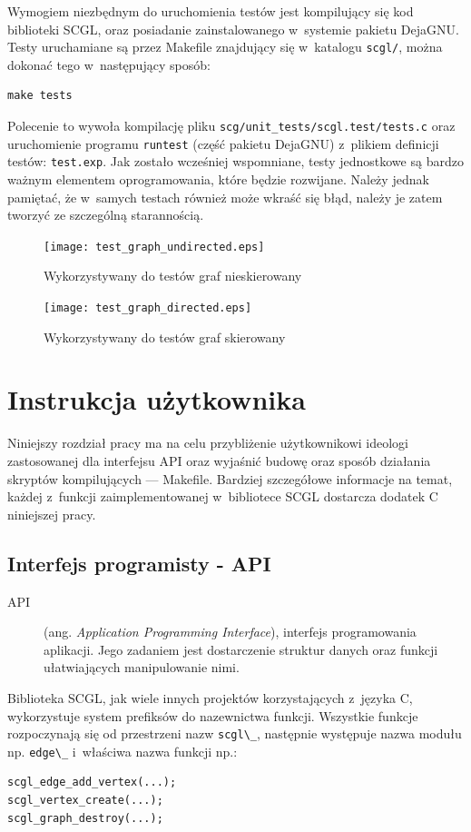 \documentclass[a4paper,12pt,polish,oneside,openright]{thesis}
\newcommand\code[1]{\lstinline[style=line]{#1}}
\begin{document}
Wymogiem niezbędnym do uruchomienia testów jest kompilujący się kod biblioteki SCGL, oraz posiadanie zainstalowanego w~systemie pakietu DejaGNU.
Testy uruchamiane są przez Makefile znajdujący się w~katalogu \code{scgl/}, można dokonać tego w~następujący sposób:
\begin{lstlisting}[style=coden]
make tests
\end{lstlisting}
Polecenie to wywoła kompilację pliku \code{scg/unit_tests/scgl.test/tests.c} oraz uruchomienie programu \code{runtest} (część pakietu DejaGNU) z~plikiem definicji testów: \code{test.exp}.
Jak zostało wcześniej wspomniane, testy jednostkowe są bardzo ważnym elementem oprogramowania, które będzie rozwijane.
Należy jednak pamiętać, że w~samych testach również może wkraść się błąd, należy je zatem tworzyć ze szczególną starannością.

\begin{figure}[htb]
	\begin{center}
		\texttt{[image: test\_graph\_undirected.eps]}
		\caption{Wykorzystywany do testów graf nieskierowany}
		\label{fig:test_undirected}
	\end{center}
\end{figure}
\begin{figure}[htb]
	\begin{center}
		\texttt{[image: test\_graph\_directed.eps]}
		\caption{Wykorzystywany do testów graf skierowany}
		\label{fig:test_directed}
	\end{center}
\end{figure}


\section{Instrukcja użytkownika}
Niniejszy rozdział pracy ma na celu przybliżenie użytkownikowi ideologi zastosowanej dla interfejsu API oraz wyjaśnić budowę oraz sposób działania skryptów kompilujących --- Makefile.
Bardziej szczegółowe informacje na temat, każdej z~funkcji zaimplementowanej w~bibliotece SCGL dostarcza dodatek C niniejszej pracy.

\subsection{Interfejs programisty - API}
\label{chap:api}
\begin{description}
	\item[API] (ang. \emph{Application Programming Interface}), interfejs programowania aplikacji. Jego zadaniem jest dostarczenie struktur danych oraz funkcji ułatwiających manipulowanie nimi.
\end{description}
Biblioteka SCGL, jak wiele innych projektów korzystających z~języka C, wykorzystuje system prefiksów do nazewnictwa funkcji.
Wszystkie funkcje rozpoczynają się od przestrzeni nazw \code{scgl\_}, następnie występuje nazwa modułu np. \code{edge\_} i~właściwa nazwa funkcji np.:
\begin{lstlisting}[style=coden,caption=Przykłady przestrzeni nazw biblioteki SCGL,label=lst:funsuffix]
scgl_edge_add_vertex(...);
scgl_vertex_create(...);
scgl_graph_destroy(...);
\end{lstlisting}
\end{document}
